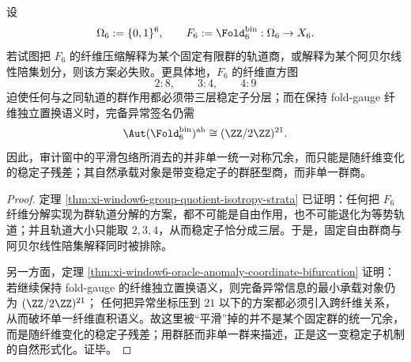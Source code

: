 \begin{theorem}\label{thm:xi-time-part67-window6-nonfree-group-quotient-obstruction}
设
\[
\Omega_6:=\{0,1\}^6,
\qquad
F_6:=\Fold_6^{\mathrm{bin}}:\Omega_6\to X_6.
\]
若试图把 \(F_6\) 的纤维压缩解释为某个固定有限群的轨道商，或解释为某个阿贝尔线性陪集划分，则该方案必失败。更具体地，\(F_6\) 的纤维直方图
\[
2:8,\qquad 3:4,\qquad 4:9
\]
迫使任何与之同轨道的群作用都必须带三层稳定子分层；而在保持 fold-gauge 纤维独立置换语义时，完备异常签名仍需
\[
\Aut(\Fold_6^{\mathrm{bin}})^{\mathrm{ab}}\cong (\ZZ/2\ZZ)^{21}.
\]
因此，审计窗中的平滑包络所消去的并非单一统一对称冗余，而只能是随纤维变化的稳定子残差；其自然承载对象是带变稳定子的群胚型商，而非单一群商。
\end{theorem}
\begin{proof}
定理 \ref{thm:xi-window6-group-quotient-isotropy-strata} 已证明：任何把 \(F_6\) 纤维分解实现为群轨道分解的方案，都不可能是自由作用，也不可能退化为等势轨道；并且轨道大小只能取 \(2,3,4\)，从而稳定子恰分成三层。于是，固定自由群商与阿贝尔线性陪集解释同时被排除。

另一方面，定理 \ref{thm:xi-window6-oracle-anomaly-coordinate-bifurcation} 证明：若继续保持 fold-gauge 的纤维独立置换语义，则完备异常信息的最小承载对象仍为
\(
(\ZZ/2\ZZ)^{21}
\)；
任何把异常坐标压到 \(21\) 以下的方案都必须引入跨纤维关系，从而破坏单一纤维直积语义。故这里被“平滑”掉的并不是某个固定群的统一冗余，而是随纤维变化的稳定子残差；用群胚而非单一群来描述，正是这一变稳定子机制的自然形式化。证毕。
\end{proof}

